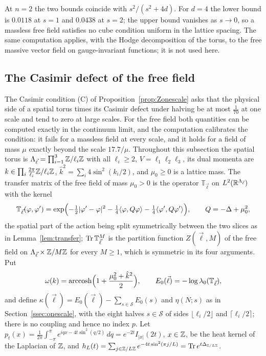 At $n=2$ the two bounds coincide with $s^2/(s^2+4d)$. For $d=4$ the lower
bound is $0.0118$ at $s=1$ and $0.0438$ at $s=2$; the upper bound vanishes as
$s\to0$, so a massless free field satisfies no cube condition uniform in the
lattice spacing. The same computation applies, with the Hodge decomposition of the
torus, to the free massive vector field on gauge-invariant functions; it is
not used here.


\subsection{The Casimir defect of the free field}\label{ssec:freecasimir}

The Casimir condition (C) of Proposition~\ref{prop:Zonescale} asks that the
physical side of a spatial torus times its Casimir defect under halving be
at most $\frac1{70}$ at one scale and tend to zero at large scales. For the
free field both quantities can be computed exactly in the continuum limit,
and the computation calibrates the condition: it fails for a massless field
at every scale, and it holds for a field of mass $\mu$ exactly beyond the
scale $17.7/\mu$. Throughout this subsection the spatial torus is
$\Lambda_{\vec\ell}=\prod_{i=1}^3\mathbb{Z}/\ell_i\mathbb{Z}$ with all $\ell_i\ge2$, $V=
\ell_1\ell_2\ell_3$, its dual momenta are $k\in\prod_i\frac{2\pi}{\ell_i}
\mathbb{Z}/\ell_i\mathbb{Z}$, $\hat k^2=\sum_i4\sin^2(k_i/2)$, and $\mu_0\ge0$ is a lattice
mass. The transfer matrix of the free field of mass $\mu_0>0$ is the
operator $\mathbb T_{\vec\ell}$ on $L^2(\mathbb{R}^{\Lambda_{\vec\ell}})$ with the
kernel
\begin{equation}\label{eq:freekernel}
\mathbb T_{\vec\ell}(\varphi,\varphi')=\exp\Bigl(-\tfrac12|\varphi'-\varphi|^2
-\tfrac14\langle \varphi,Q\varphi\rangle-\tfrac14\langle \varphi',Q\varphi'\rangle\Bigr),\qquad
Q=-\Delta+\mu_0^2,
\end{equation}
the spatial part of the action being split symmetrically between the two
slices as in Lemma~\ref{lem:transfer}; $\operatorname{Tr}\mathbb T_{\vec\ell}^M$ is the
partition function $Z(\vec\ell,M)$ of the free field on $\Lambda_{\vec\ell}
\times\mathbb{Z}/M\mathbb{Z}$ for every $M\ge1$, which is symmetric in its four arguments.
Put
\[
\omega(k)=\operatorname{arccosh}\Bigl(1+\frac{\mu_0^2+\hat k^2}2\Bigr),
\qquad E_0(\vec\ell)=-\log\lambda_0(\mathbb T_{\vec\ell}),
\]
and define $\kappa(\vec\ell)=E_0(\vec\ell)-\sum_{s\in\mathcal S}E_0(s)$ and
$\eta(N;s)$ as in Section~\ref{ssec:onescale}, with the eight halves $s\in
\mathcal S$ of sides $\lfloor\ell_i/2\rfloor$ and $\lceil\ell_i/2\rceil$;
there is no coupling and hence no index $p$. Let $p_t(x)=\frac1{2\pi}
\int_{-\pi}^{\pi}e^{iqx-4t\sin^2(q/2)}\,dq=e^{-2t}I_{|x|}(2t)$, $x\in\mathbb{Z}$, be
the heat kernel of the Laplacian of $\mathbb{Z}$, and $h_L(t)=\sum_{j\in\mathbb{Z}/L\mathbb{Z}}
e^{-4t\sin^2(\pi j/L)}=\operatorname{Tr} e^{t\Delta_{\mathbb{Z}/L\mathbb{Z}}}$.

